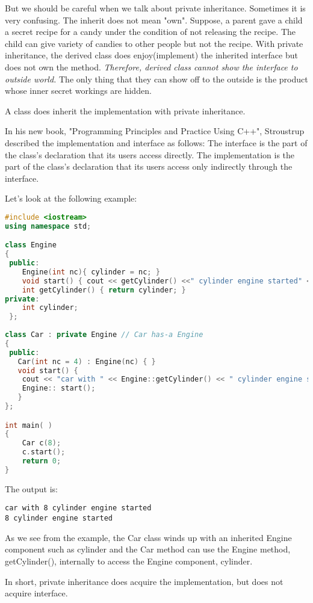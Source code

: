 \documentclass{book}
\begin{document}
But we should be careful when we talk about private inheritance. Sometimes it is very confusing. The inherit does not mean "own".
Suppose, a parent gave a child a secret recipe for a candy under the condition of not releasing the recipe.
The child can give variety of candies to other people but not the recipe.
With private inheritance, the derived class does enjoy(implement) the inherited interface but does not own the method.
\textit{Therefore, derived class cannot show the interface to outside world.} The only thing that they can show off to the outside is the product whose inner secret workings are hidden.

A class does inherit the implementation with private inheritance.

In his new book, "Programming Principles and Practice Using C++", Stroustrup described the implementation and interface as follows:
The interface is the part of the class's declaration that its users access directly.
The implementation is the part of the class's declaration that its users access only indirectly through the interface.

Let's look at the following example:

\begin{lstlisting}[caption={Private inheritance exmaple 2}, language=C++]
#include <iostream>
using namespace std;

class Engine 
{
 public:
	Engine(int nc){ cylinder = nc; }
	void start() { cout << getCylinder() <<" cylinder engine started" << endl; };
	int getCylinder() { return cylinder; }
private:
	int cylinder;
 };
 
class Car : private Engine // Car has-a Engine
{
 public:
   Car(int nc = 4) : Engine(nc) { }        
   void start() {
	cout << "car with " << Engine::getCylinder() << " cylinder engine started" << endl;
	Engine:: start();
   }
}; 

int main( ) 
{ 
	Car c(8);
	c.start();
	return 0; 
}
\end{lstlisting}
The output is:
\begin{verbatim}
car with 8 cylinder engine started
8 cylinder engine started
\end{verbatim}

As we see from the example, the Car class winds up with an inherited Engine component such as cylinder and the Car method can use the Engine method,
getCylinder(), internally to access the Engine component, cylinder.

In short, private inheritance does acquire the implementation, but does not acquire interface.
\end{document}
